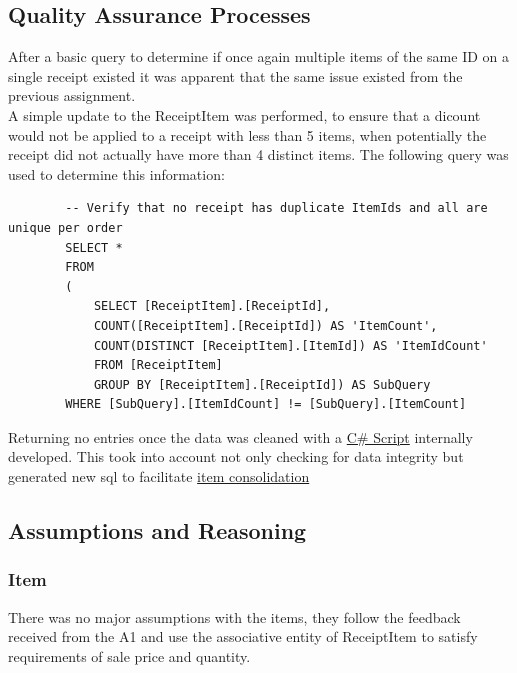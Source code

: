 \documentclass{article}
\begin{document}
        \subsection{Quality Assurance Processes}
        \label{sec:QAP}
        After a basic query to determine if once again multiple 
        items of the same ID on a single receipt existed it was 
        apparent that the same issue existed from the previous 
        assignment.
        \\
        A simple update to the ReceiptItem was performed, to ensure
        that a dicount would not be applied to a receipt with 
        less than 5 items, when potentially the receipt did not 
        actually have more than 4 distinct items.
        The following query was used to determine this information:
        \begin{lstlisting}
        -- Verify that no receipt has duplicate ItemIds and all are unique per order
        SELECT *
        FROM
        (
            SELECT [ReceiptItem].[ReceiptId], 
            COUNT([ReceiptItem].[ReceiptId]) AS 'ItemCount',
            COUNT(DISTINCT [ReceiptItem].[ItemId]) AS 'ItemIdCount'
            FROM [ReceiptItem]
            GROUP BY [ReceiptItem].[ReceiptId]) AS SubQuery 
        WHERE [SubQuery].[ItemIdCount] != [SubQuery].[ItemCount]
        \end{lstlisting}

        Returning no entries once the data was cleaned with a 
        \hyperref[sec:sharpccleaning]{\color{blue}C\# Script} internally developed.
        This took into account not only checking for data integrity
        but generated new sql to facilitate \hyperref[sec:sharpcsqlgeneration]{\color{blue}item consolidation}


        \subsection{Assumptions and Reasoning}
        \label{sec:AR}
            \subsubsection{Item}
                There was no major assumptions with the items,
                they follow the feedback received from the A1 
                and use the associative entity of ReceiptItem
                to satisfy requirements of sale price and quantity.
\end{document}
